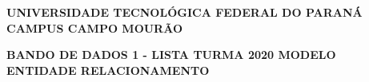 \documentclass[a4paper, 12pt]{article}
\begin{document}
	
	\hspace{5cm}
	
	\begin{large}
		\begin{center}
			\textbf{UNIVERSIDADE TECNOLÓGICA FEDERAL DO PARANÁ}\newline
			\textbf{CAMPUS CAMPO MOURÃO}
		\end{center}
	\end{large}
	
	\vspace{0.5cm}
	
	\begin{center}
		\textbf{BANDO DE DADOS 1 - LISTA TURMA 2020 MODELO ENTIDADE RELACIONAMENTO}
	\end{center}

	\vspace{0.5cm}
	

	
	
\end{document}
